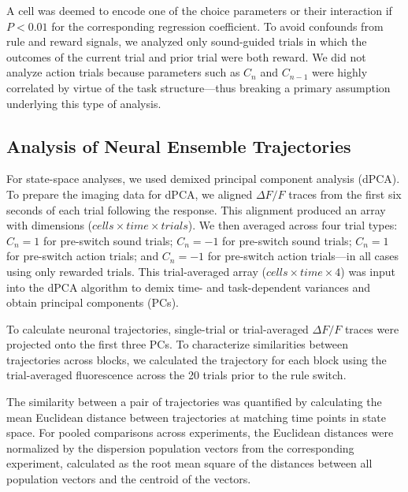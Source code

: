 A cell was deemed to encode one of the choice parameters or their interaction if $P < 0.01$ for the corresponding regression coefficient. To avoid confounds from rule and reward signals, we analyzed only sound-guided trials in which the outcomes of the current trial and prior trial were both reward. We did not analyze action trials because parameters such as $C_n$ and $C_{n-1}$ were highly correlated by virtue of the task structure---thus breaking a primary assumption underlying this type of analysis.

\subsection*{Analysis of Neural Ensemble Trajectories}
For state-space analyses, we used demixed principal component analysis \citep{machens2010functional} (dPCA). To prepare the imaging data for dPCA, we aligned $\Delta F/F$ traces from the first six seconds of each trial following the response. This alignment produced an array with dimensions ($cells \times time \times trials$). We then averaged across four trial types: $C_n = 1$ for pre-switch sound trials; $C_n = -1$ for pre-switch sound trials; $C_n = 1$ for pre-switch action trials; and $C_n = -1$ for pre-switch action trials---in all cases using only rewarded trials. This trial-averaged array ($cells \times time \times 4$) was input into the dPCA algorithm to demix time- and task-dependent variances and obtain principal components (PCs). 

To calculate neuronal trajectories, single-trial or trial-averaged $\Delta F/F$ traces were projected onto the first three PCs. To characterize similarities between trajectories across blocks, we calculated the trajectory for each block using the trial-averaged fluorescence across the 20 trials prior to the rule switch. 

The similarity between a pair of trajectories was quantified by calculating the mean Euclidean distance between trajectories at matching time points in state space. For pooled comparisons across experiments, the Euclidean distances were normalized by the dispersion population vectors from the corresponding experiment, calculated as the root mean square of the distances between all population vectors and the centroid of the vectors. 

